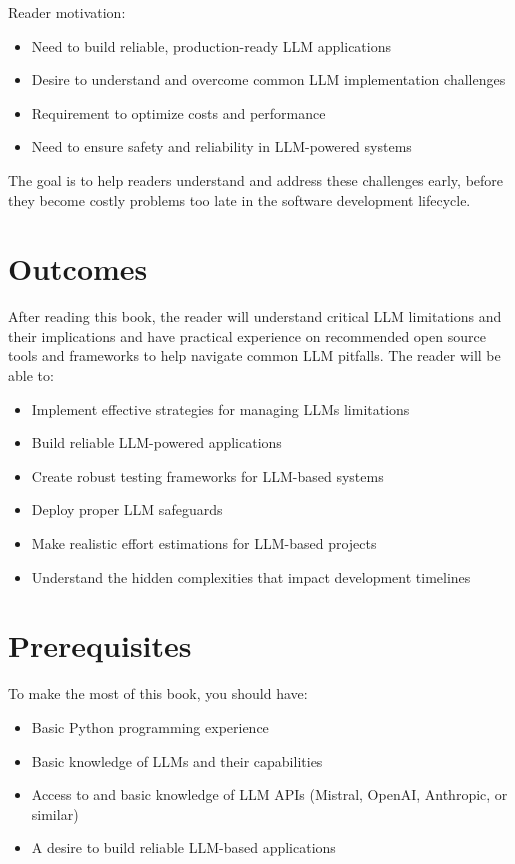Reader motivation:

\begin{itemize}
\item Need to build reliable, production-ready LLM applications
\item Desire to understand and overcome common LLM implementation challenges
\item Requirement to optimize costs and performance
\item Need to ensure safety and reliability in LLM-powered systems
\end{itemize}

The goal is to help readers understand and address these challenges early, before they become costly problems too late in the software development lifecycle.

\section{Outcomes}

After reading this book, the reader will understand critical LLM limitations and their implications and have practical experience on recommended open source tools and frameworks to help navigate common LLM pitfalls. The reader will be able to:

\begin{itemize}
\item Implement effective strategies for managing LLMs limitations
\item Build reliable LLM-powered applications
\item Create robust testing frameworks for LLM-based systems
\item Deploy proper LLM safeguards
\item Make realistic effort estimations for LLM-based projects
\item Understand the hidden complexities that impact development timelines
\end{itemize}

\section{Prerequisites}

To make the most of this book, you should have:

\begin{itemize}
\item Basic Python programming experience
\item Basic knowledge of LLMs and their capabilities
\item Access to and basic knowledge of LLM APIs (Mistral, OpenAI, Anthropic, or similar)
\item A desire to build reliable LLM-based applications
\end{itemize}

